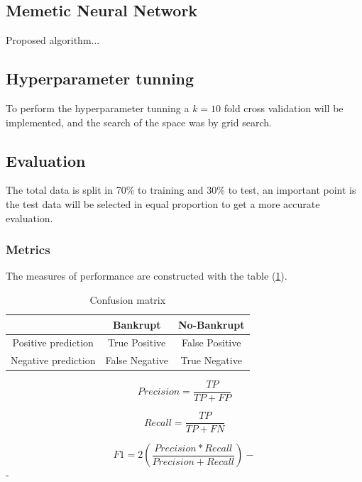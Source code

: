 \documentclass[journal]{IEEEtai}
\begin{document}
\subsection{Memetic Neural Network}

Proposed algorithm...

\subsection{Hyperparameter tunning}
To perform the hyperparameter tunning a $k=10$ fold cross validation will be implemented, and the search of the space was by grid search.


\subsection{Evaluation}
The total data is split in 70\% to training and 30\% to test, an important point is the test data will be selected in equal proportion to get a more accurate evaluation.

\subsubsection{Metrics}


The measures of performance are constructed with the table (\ref{confusemat}).

\begin{table}[h]
\caption{Confusion matrix}
\label{confusemat}
\centering
\begin{tabular}{ccc}
	\hline
 & Bankrupt & No-Bankrupt \\ \hline
Positive prediction & True Positive & False Positive \\
Negative prediction & False Negative & True Negative \\ \hline
\end{tabular}
\end{table}

\begin{equation}
Precision = \frac{TP}{TP + FP}
\end{equation}


\begin{equation}
Recall = \frac{TP}{TP+ FN}
\end{equation}



\begin{equation}
F1 = 2	\left( \frac{Precision*Recall}{Precision + Recall} \right)
-\end{equation}
-
\end{document}
